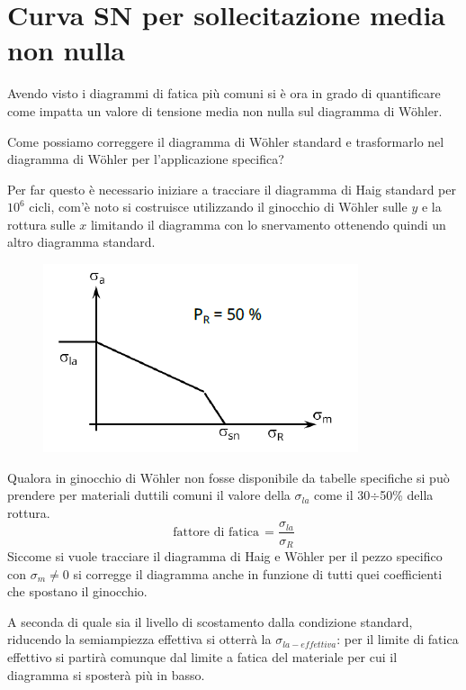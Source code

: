 \section{Curva SN per sollecitazione media non nulla}
			Avendo visto i diagrammi di fatica più comuni si è ora in grado di quantificare come impatta un valore di tensione media non nulla sul diagramma di Wöhler. \newline
			
			Come possiamo correggere il diagramma di Wöhler standard e trasformarlo nel diagramma di Wöhler per l'applicazione specifica?
			
			Per far questo è necessario iniziare a tracciare il diagramma di Haig standard per $10^6$ cicli, com'è noto si costruisce utilizzando il ginocchio di Wöhler sulle $y$ e la rottura sulle $x$ limitando il diagramma con lo snervamento ottenendo quindi un altro diagramma standard. 
\begin{figure}[H]
	\centering
	\label{fig:screenshot019}
	\includegraphics[width=0.5\linewidth]{immagini_11/screenshot019}
\end{figure}
			Qualora in ginocchio di Wöhler non fosse disponibile da tabelle specifiche si può prendere per materiali duttili comuni il valore della $\sigma_{la}$ come il 30$\div$50\% della rottura. 
			\[\text{fattore di fatica}\,=\dfrac{\sigma_{la}}{\sigma_R}\] 						
			Siccome si vuole tracciare il diagramma di Haig e Wöhler per il pezzo specifico con $\sigma_m\ne0$ si corregge il diagramma anche in funzione di tutti quei coefficienti che spostano il ginocchio.
			
			A seconda di quale sia il livello di scostamento dalla condizione standard, riducendo la semiampiezza effettiva si otterrà la $\sigma_{la-effettiva}$: per il limite di fatica effettivo si partirà comunque dal limite a fatica del materiale per cui il diagramma si sposterà più in basso. \newline 
			
